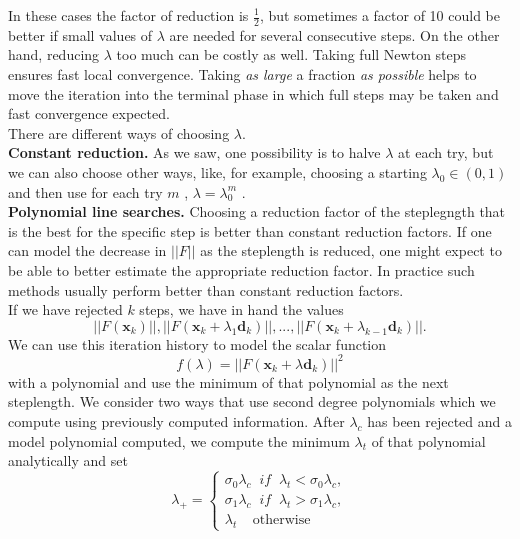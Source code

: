   In these cases the factor of reduction is $\frac{1}{2}$, but sometimes a factor of 10 could be better if small values of $\lambda$ are needed for several consecutive steps. On the other hand, reducing $\lambda$ too much can be costly as well. Taking full Newton steps ensures fast local convergence. Taking \textit{as large} a fraction \textit{as
  possible} helps to move the iteration into the terminal phase in which full steps
  may be taken and fast convergence expected.\\
  There are different ways of choosing $\lambda$.\\
  \noindent\textbf{Constant reduction.} As we saw, one possibility is to halve $\lambda$ at each try, but we can also choose other ways, like, for example, choosing a starting $\lambda_0 \in (0,1)$ and then use for each try $m$ , $\lambda = \lambda_0^m$ .\\
  \noindent\textbf{Polynomial line searches.} Choosing a reduction factor of the steplegngth that is the best for the specific step is better than constant reduction factors. If one can model the decrease
  in $||F||$ as the steplength is reduced, one might expect to be able to better
  estimate the appropriate reduction factor.
  In practice such methods usually
  perform better than constant reduction factors.\\
  If we have rejected $k$ steps, we have in hand the values
  \begin{equation*}
  ||F(\textbf{x}_k)||,||F(\textbf{x}_k+\lambda_1\textbf{d}_k)||,...,||F(\textbf{x}_k+\lambda_{k-1}\textbf{d}_k)||.
  \end{equation*}
  We can use this iteration history to model the scalar function
	  \begin{equation*}
	  f(\lambda)=||F(\textbf{x}_k + \lambda \textbf{d}_k)||^2
	  \end{equation*}
	  with a polynomial and use the minimum of that polynomial as the next steplength.
  We consider two ways that use second degree polynomials which we compute using previously computed information. After $\lambda_c$  has been rejected and a model polynomial computed, we compute the minimum $\lambda_t$ of that polynomial analytically and set
  \begin{equation}
  \lambda_+={
  	\begin{cases}
  	\label{lambda+}
  	\sigma_0\lambda_c \; \; if \; \; \lambda_t<\sigma_0\lambda_c, \\
  	\sigma_1\lambda_c \; \; if \; \; \lambda_t>\sigma_1\lambda_c,\\
  	\lambda_t \; \; \; \; \text{otherwise}
  	
  	\end{cases}}
  \end{equation}
